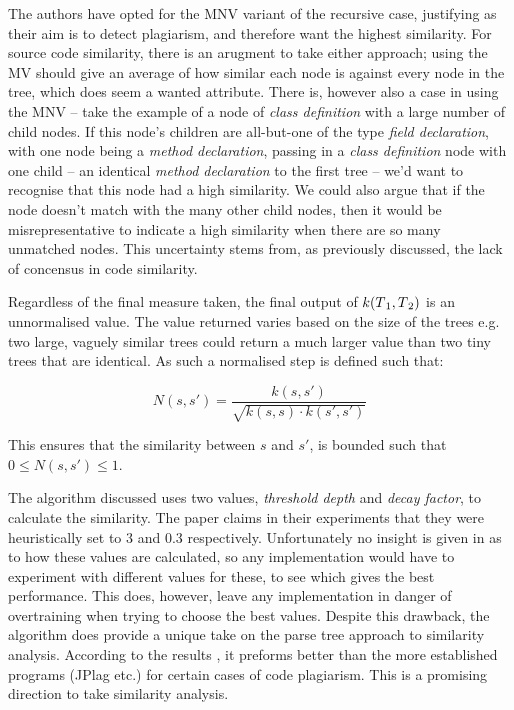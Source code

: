 The authors have opted for the MNV variant of the recursive case, justifying
as their aim is to detect plagiarism, and therefore want the highest similarity.
For source code similarity, there is an arugment to take either approach; 
using the MV should give an average of how similar each node is
against every node in the tree, which does seem a wanted attribute. There is,
however also a case in using the MNV -- take the example of a node
of \emph{class definition} with a large number of child nodes. If this
node's children are all-but-one of the type \emph{field declaration}, with one
node being a \emph{method declaration}, passing in a \emph{class definition} node
with one child -- an identical \emph{method declaration} to the first tree -- we'd
want to recognise that this node had a high similarity. We could also argue that
if the node doesn't match with the many other child nodes, then it would be
misrepresentative to indicate a high similarity when there are so many unmatched
nodes. This uncertainty stems from, as previously discussed, the lack of concensus
in code similarity.

Regardless of the final measure taken, the final output of $k(T\textsubscript{1},
T\textsubscript{2})$ is an unnormalised value. The value returned varies 
based on the size of the trees e.g. two large, vaguely similar trees 
could return a much larger value than two tiny trees that are identical. As
such a normalised step is defined such that:

\begin{equation}
N(s,s') = \frac{k(s, s')}{\sqrt{k(s, s) \cdot k(s', s')}}
\end{equation}

This ensures that the similarity between $s$ and $s'$, is bounded such that 
$0 \le N(s, s') \le 1$.

The algorithm discussed uses two values, \emph{threshold depth} and 
\emph{decay factor}, to calculate the similarity. The paper claims in their
experiments that they were heuristically set to 3 and 0.3 respectively.
Unfortunately no insight is given in \cite{ParseTreeKernel} as to how these
values are calculated, so any implementation would have to experiment with
different values for these, to see which gives the best performance.
This does, however, leave any implementation in danger of overtraining
when trying to choose the best values. Despite this drawback, the algorithm does
provide a unique take on the parse tree approach to similarity analysis. According
to the results \cite{ParseTreeKernel}, it preforms better than the more established
programs (JPlag etc.) for certain cases of code plagiarism. This is a promising
direction to take similarity analysis.


